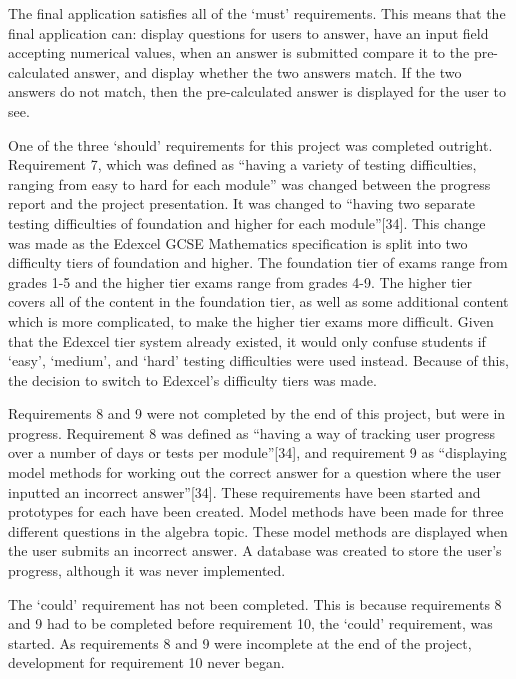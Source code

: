 \documentclass{article}
\begin{document}
The final application satisfies all of the `must' requirements. This means that the final application can: display questions for users to answer, have an input field accepting numerical values, when an answer is submitted compare it to the pre-calculated answer, and display whether the two answers match. If the two answers do not match, then the pre-calculated answer is displayed for the user to see. \par

One of the three `should' requirements for this project was completed outright. Requirement 7, which was defined as ``having a variety of testing difficulties, ranging from easy to hard for each module'' was changed between the progress report and the project presentation. It was changed to ``having two separate testing difficulties of foundation and higher for each module''[34]. This change was made as the Edexcel GCSE Mathematics specification is split into two difficulty tiers of foundation and higher. The foundation tier of exams range from grades 1-5 and the higher tier exams range from grades 4-9. The higher tier covers all of the content in the foundation tier, as well as some additional content which is more complicated, to make the higher tier exams more difficult. Given that the Edexcel tier system already existed, it would only confuse students if `easy', `medium', and `hard' testing difficulties were used instead. Because of this, the decision to switch to Edexcel's difficulty tiers was made. \par

Requirements 8 and 9 were not completed by the end of this project, but were in progress. Requirement 8 was defined as ``having a way of tracking user progress over a number of days or tests per module''[34], and requirement 9 as ``displaying model methods for working out the correct answer for a question where the user inputted an incorrect answer''[34]. These requirements have been started and prototypes for each have been created. Model methods have been made for three different questions in the algebra topic. These model methods are displayed when the user submits an incorrect answer. A database was created to store the user's progress, although it was never implemented. \par

The `could' requirement has not been completed. This is because requirements 8 and 9 had to be completed before requirement 10, the `could' requirement, was started. As requirements 8 and 9 were incomplete at the end of the project, development for requirement 10 never began. \par
\end{document}

